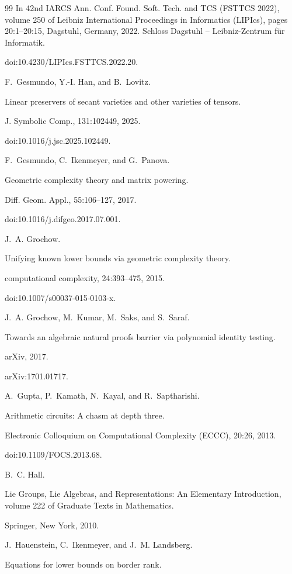 \begin{thebibliography}{99}
In 42nd IARCS Ann. Conf. Found. Soft. Tech. and TCS (FSTTCS
2022), volume 250 of Leibniz International Proceedings in Informatics
(LIPIcs), pages 20:1–20:15, Dagstuhl, Germany, 2022. Schloss Dagstuhl –
Leibniz-Zentrum für Informatik.


doi:10.4230/LIPIcs.FSTTCS.2022.20.

F. Gesmundo, Y.-I. Han, and B. Lovitz.


Linear preservers of secant varieties and other varieties of
tensors.


J. Symbolic Comp., 131:102449, 2025.


doi:10.1016/j.jsc.2025.102449.

F. Gesmundo, C. Ikenmeyer, and G. Panova.


Geometric complexity theory and matrix powering.


Diff. Geom. Appl., 55:106–127, 2017.


doi:10.1016/j.difgeo.2017.07.001.

J. A. Grochow.


Unifying known lower bounds via geometric complexity theory.


computational complexity, 24:393–475, 2015.


doi:10.1007/s00037-015-0103-x.

J. A. Grochow, M. Kumar, M. Saks, and S. Saraf.


Towards an algebraic natural proofs barrier via polynomial identity
testing.


arXiv, 2017.


arXiv:1701.01717.

A. Gupta, P. Kamath, N. Kayal, and R. Saptharishi.


Arithmetic circuits: A chasm at depth three.


Electronic Colloquium on Computational Complexity (ECCC),
20:26, 2013.


doi:10.1109/FOCS.2013.68.

B. C. Hall.


Lie Groups, Lie Algebras, and Representations: An
Elementary Introduction, volume 222 of Graduate Texts in
Mathematics.


Springer, New York, 2010.

J. Hauenstein, C. Ikenmeyer, and J. M. Landsberg.


Equations for lower bounds on border rank.



\end{thebibliography}
